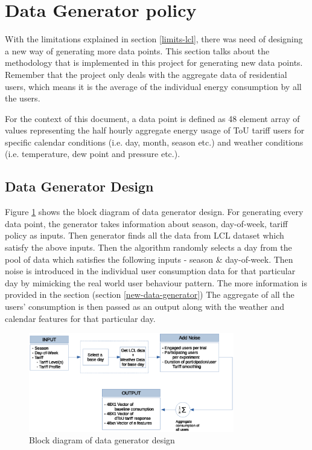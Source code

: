 \section{Data Generator policy}
With the limitations explained in section \ref{limits-lcl}, there was need of designing a new way of generating more data points. This section talks about the methodology that is implemented in this project for generating new data points. Remember that the project only deals with the aggregate data of residential users, which means it is the average of the individual energy consumption by all the users.

For the context of this document, a data point is defined as 48 element array of values representing the half hourly aggregate energy usage of ToU tariff users for specific calendar conditions (i.e. day, month, season etc.) and weather conditions (i.e. temperature, dew point and pressure etc.).


\subsection{Data Generator Design}

Figure \ref{fig:simulator-design} shows the block diagram of data generator design. For generating every data point, the generator takes information about season, day-of-week, tariff policy as inputs. Then generator finds all the data from LCL dataset which satisfy the above inputs. Then the algorithm randomly selects a day from the pool of data which satisfies the following inputs - season \& day-of-week. Then noise is introduced in the individual user consumption data for that particular day by mimicking the real world user behaviour pattern. The more information is provided in the  section (section \ref{new-data-generator}) The aggregate of all the users' consumption is then passed as an output along with the weather and calendar features for that particular day.

\begin{figure}[h]
    \includegraphics[width=0.8\textwidth]{img/simulator.eps}
    \centering
    \caption{Block diagram of data generator design}
    \label{fig:simulator-design}
\end{figure}

